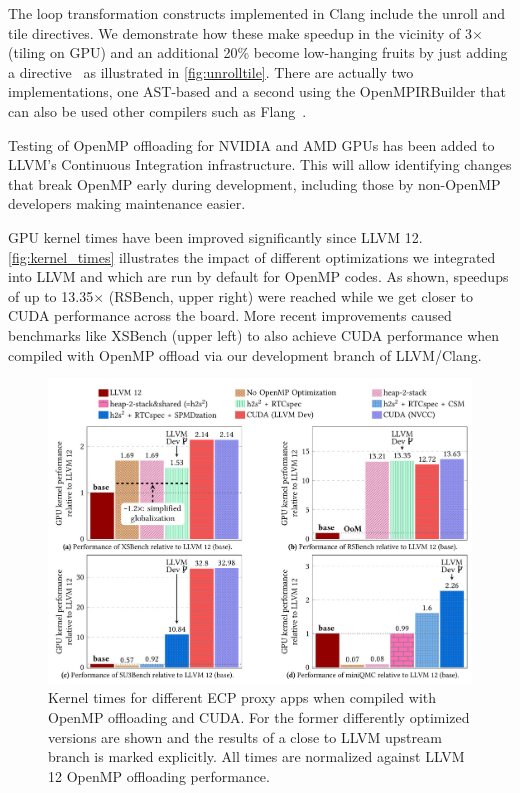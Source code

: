 The loop transformation constructs implemented in Clang include the unroll and tile directives.
We demonstrate how these make speedup in the vicinity of 3$\times$ (tiling on GPU) and an additional 20\% become
low-hanging fruits by just adding a directive~\cite{kruse2021openmpbooth} as illustrated in \autoref{fig:unrolltile}.
There are actually two implementations, one AST-based and a second using the OpenMPIRBuilder that can also be used other compilers such as Flang~\cite{kruse2021clangast}.

Testing of OpenMP offloading for NVIDIA and AMD GPUs has been added to LLVM's Continuous Integration infrastructure.
This will allow identifying changes that break OpenMP early during development, including those by non-OpenMP developers making maintenance easier.

GPU kernel times have been improved significantly since LLVM 12. \autoref{fig:kernel_times} illustrates the impact of
different optimizations we integrated into LLVM and which are run by default for OpenMP codes. As shown, speedups
of up to 13.35$\times$ (RSBench, upper right) were reached while we get closer to CUDA
performance across the board. More recent improvements caused benchmarks like
XSBench (upper left) to also achieve CUDA performance when compiled with OpenMP
offload via our development branch of LLVM/Clang.

\begin{figure}[hbt!]
\centering
\includegraphics[width=0.95\linewidth]{projects/2.3.2-Tools/2.3.2.11-SOLLVE/LLVM-opt-kernel-times.jpg}
\caption[]{Kernel times for different ECP proxy apps when compiled with OpenMP offloading and CUDA. For the former differently optimized versions are shown and the results of a close to LLVM upstream branch is marked explicitly. All times are normalized against LLVM 12 OpenMP offloading performance.}
\label{fig:kernel_times}
\end{figure}

